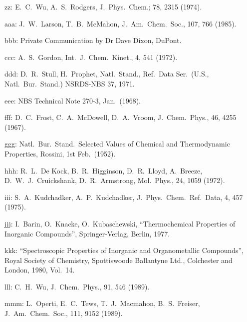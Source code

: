 \begin{description}
\item{  zz: } E.\ C.\ Wu, A.\ S.\ Rodgers, J.\ Phys.\ Chem.; 78, 2315 (1974).
  
\item{ aaa: } J.\ W.\ Larson, T.\ B.\ McMahon, J.\ Am.\ Chem.\ Soc., 107, 766 (1985).
  
\item{ bbb: } Private Communication by Dr Dave Dixon, DuPont.
  
\item{ ccc: } A.\ S.\ Gordon, Int.\ J.\ Chem.\ Kinet., 4, 541 (1972).
  
\item{ ddd: } D.\ R.\ Stull, H.\ Prophet, Natl.\ Stand., Ref.\ Data Ser.\ (U.S., Natl.\ Bur.\
       Stand.) NSRDS-NBS 37, 1971.
  
\item{ eee: } NBS Technical Note 270-3, Jan.\ (1968).
  
\item{ fff: } D.\ C.\ Frost, C.\ A.\ McDowell, D.\ A.\ Vroom, J.\ Chem.\ Phys., 46, 4255 (1967).
  
\item{ ggg: } Natl.\ Bur.\ Stand.\ Selected Values of Chemical and Thermodynamic Properties,
       Rossini, 1st Feb.\ (1952).
  
\item{ hhh: } R.\ L.\ De Kock, B.\ R.\ Higginson, D.\ R.\ Lloyd, A.\ Breeze,
       D.\ W.\ J.\ Cruickshank, D.\ R.\ Armstrong, Mol.\ Phys., 24, 1059 (1972).
  
\item{ iii: } S.\ A.\ Kudchadker, A.\ P.\ Kudchadker, J.\ Phys.\ Chem.\ Ref.\ Data,
       4, 457 (1975).
  
\item{ jjj: } I.\ Barin, O.\ Knacke, O.\ Kubaschewski, ``Thermochemical Properties of
       Inorganic Compounds'', Springer-Verlag, Berlin, 1977.
  
\item{ kkk: } ``Spectroscopic Properties of Inorganic and Organometallic Compounds'',
       Royal Society of Chemistry, Spottiswoode Ballantyne Ltd., Colchester
       and London, 1980, Vol.\ 14.
  
\item{ lll: } C.\ H.\ Wu, J.\ Chem.\ Phys., 91, 546 (1989).
  
\item{ mmm: } L.\ Operti, E.\ C.\ Tews, T.\ J.\ Macmahon, B.\ S.\ Freiser, J.\ Am.\ Chem.\ Soc.,
       111, 9152 (1989).
  

\end{description}
